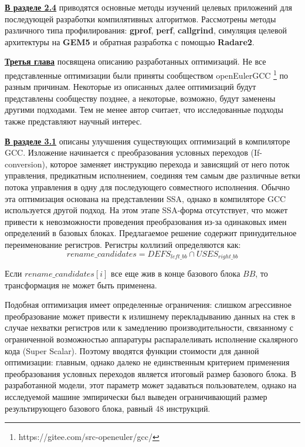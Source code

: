\underline{\textbf{В разделе 2.4}} приводятся основные методы изучений целевых приложений
для последующей разработки компилятивных алгоритмов. Рассмотрены методы различного типа профилирования: \textbf{gprof}, \textbf{perf}, \textbf{callgrind}, симуляция целевой архитектуры на \textbf{GEM5} и обратная разработка с помощью \textbf{Radare2}.



\underline{\textbf{Третья глава}} посвящена описанию разработанных оптимизаций. Не все представленные
оптимизации были приняты сообществом openEulerGCC \footnote{https://gitee.com/src-openeuler/gcc/} по разным причинам.
Некоторые из описанных далее оптимизаций будут представлены сообществу
позднее, а некоторые, возможно, будут заменены другими подходами. Тем не
менее автор считает, что исследованные подходы также представляют научный
интерес.

\underline{\textbf{В разделе 3.1}} описаны улучшения существующих оптимизаций в компиляторе GCC. Изложение начинается с преобразования условных переходов (If-conversion), которое заменяет инструкцию перехода и зависящий
от него поток управления, предикатным исполнением, соединяя тем самым две
различные ветки потока управления в одну для последующего совместного исполнения. Обычно эта оптимизация основана на представлении
SSA, однако в компиляторе GCC используется другой подход. На этом этапе
SSA-форма отсутствует, что может привести к невозможности проведения преобразования из-за одинаковых имен определений в базовых блоках.  Предлагаемое решение содержит принудительное переименование регистров. Регистры коллизий определяются как:
$$rename\_candidates = DEFS_{left\_bb} \cap USES_{right\_bb} $$

Если $rename\_candidates[i]$ все еще жив в конце базового блока $BB$, то трансформация не может быть применена.

Подобная оптимизация имеет определенные ограничения: слишком агрессивное преобразование может привести к излишнему перекладыванию данных на стек в случае нехватки регистров или к замедлению производительности, связанному с ограниченной возможностью аппаратуры распаралеливать исполнение скалярного кода (Super Scalar).  Поэтому вводятся функции
стоимости для данной оптимизации: главным, однако далеко не единственным
критерием применения преобразования условных переходов является итоговый
размер базового блока. В разработанной модели, этот параметр может задаваться
пользователем, однако на исследуемой машине эмпирически был выведен
ограничивающий размер результирующего базового блока, равный 48 инструкций.


